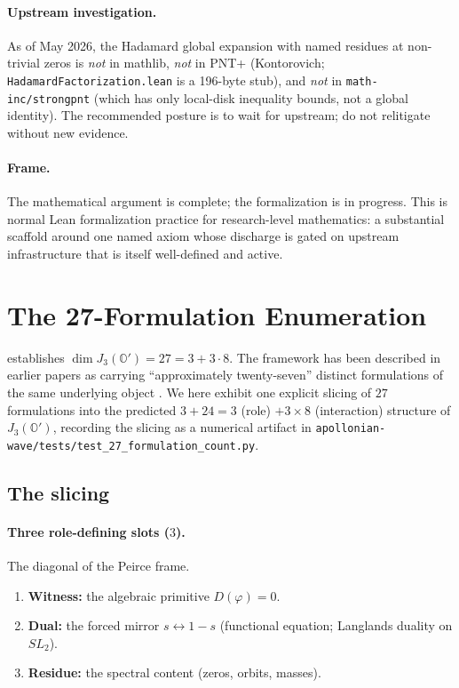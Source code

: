 \documentclass[11pt,a4paper]{article}
\theoremstyle{plain}
\theoremstyle{definition}
\theoremstyle{remark}
\numberwithin{equation}{section}
\providecommand{\Os}{\mathbb{O}'}
\providecommand{\vp}{\varphi}
\begin{document}
\paragraph{Upstream investigation.}
As of May 2026, the Hadamard global expansion with named residues
at non-trivial zeros is \emph{not} in mathlib, \emph{not} in PNT+
(Kontorovich; \texttt{HadamardFactorization.lean} is a 196-byte
stub), and \emph{not} in \texttt{math-inc/strongpnt} (which has
only local-disk inequality bounds, not a global identity).  The
recommended posture is to wait for upstream; do not relitigate
without new evidence.

\paragraph{Frame.}
The mathematical argument is complete; the formalization is in
progress.  This is normal Lean formalization practice for
research-level mathematics: a substantial scaffold around one
named axiom whose discharge is gated on upstream infrastructure
that is itself well-defined and active.

\section{The 27-Formulation Enumeration}
\label{sec:27-formulations}

 establishes $\dim J_3(\Os) = 27 = 3 + 3 \cdot 8$.
The framework has been described in earlier papers as carrying
``approximately twenty-seven'' distinct formulations of the same
underlying object \cite[\S abs.]{echo-rh}.  We here exhibit one
explicit slicing of $27$ formulations into the predicted
$3 + 24 = 3$ (role) $+ 3 \times 8$ (interaction) structure of
$J_3(\Os)$, recording the slicing as a numerical artifact in
\texttt{apollonian-wave/tests/test\_27\_formulation\_count.py}.

\subsection{The slicing}

\paragraph{Three role-defining slots ($3$).}
The diagonal of the Peirce frame.
\begin{enumerate}[label=\textbf{R\arabic*.}]
\item \textbf{Witness:} the algebraic primitive
  $D(\vp) = 0$.
\item \textbf{Dual:} the forced mirror $s \leftrightarrow 1 - s$
  (functional equation; Langlands duality on $SL_2$).
\item \textbf{Residue:} the spectral content (zeros, orbits,
  masses).
\end{enumerate}
\end{document}
